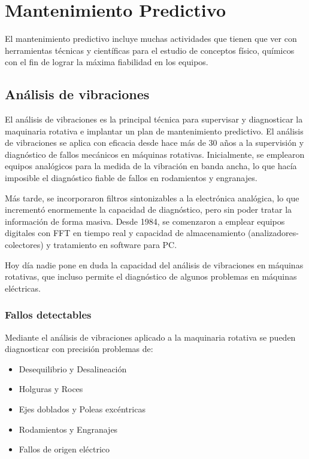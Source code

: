 \section{Mantenimiento Predictivo}



El mantenimiento predictivo incluye muchas actividades que tienen que ver con herramientas técnicas y científicas para el estudio de conceptos físico, químicos con el fin de lograr la máxima fiabilidad en los equipos.



\subsection{Análisis de vibraciones}


El análisis de vibraciones es la principal técnica para supervisar y diagnosticar la maquinaria rotativa e implantar un plan de mantenimiento predictivo.
El análisis de vibraciones se aplica con eficacia desde hace más de 30 años a la supervisión y diagnóstico de fallos mecánicos en máquinas rotativas. Inicialmente, se emplearon equipos analógicos para la medida de la vibración en banda ancha, lo que hacía imposible el diagnóstico fiable de fallos en rodamientos y engranajes.

Más tarde, se incorporaron filtros sintonizables a la electrónica analógica, lo que incrementó enormemente la capacidad de diagnóstico, pero sin poder tratar la información de forma masiva. Desde 1984, se comenzaron a emplear equipos digitales con FFT en tiempo real y capacidad de almacenamiento (analizadores-colectores) y tratamiento en software para PC.

Hoy día nadie pone en duda la capacidad del análisis de vibraciones en máquinas rotativas, que incluso permite el diagnóstico de algunos problemas en máquinas eléctricas.

\subsubsection{Fallos detectables}
Mediante el análisis de vibraciones aplicado a la maquinaria rotativa se pueden diagnosticar con precisión problemas de:
\begin{itemize}
\item Desequilibrio y Desalineación
\item Holguras y Roces
\item Ejes doblados y Poleas excéntricas
\item Rodamientos y Engranajes
\item Fallos de origen eléctrico
\end{itemize}

